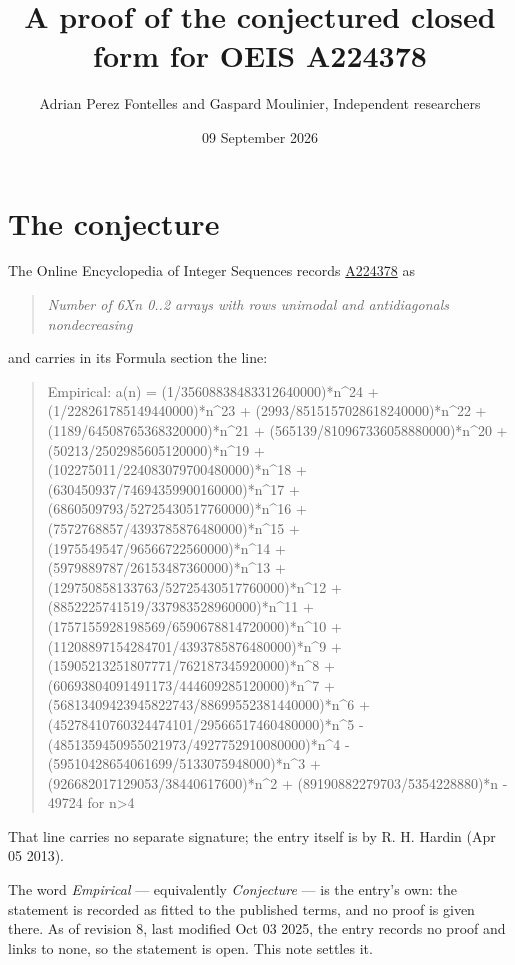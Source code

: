 \documentclass[11pt]{article}
\title{A proof of the conjectured closed form for OEIS A224378}
\author{Adrian Perez Fontelles and Gaspard Moulinier, Independent researchers}
\date{09 September 2026}
\theoremstyle{definition}
\begin{document}
\maketitle
\section{The conjecture}

The Online Encyclopedia of Integer Sequences records \href{https://oeis.org/A224378}{A224378} as

\begin{quote}\itshape Number of 6Xn 0..2 arrays with rows unimodal and antidiagonals nondecreasing\end{quote}

and carries in its Formula section the line:

\begin{quote}\ttfamily Empirical: a(n) = (1/35608838483312640000)*n\textasciicircum{}24 + (1/228261785149440000)*n\textasciicircum{}23 + (2993/8515157028618240000)*n\textasciicircum{}22 + (1189/64508765368320000)*n\textasciicircum{}21 + (565139/810967336058880000)*n\textasciicircum{}20 + (50213/2502985605120000)*n\textasciicircum{}19 + (102275011/224083079700480000)*n\textasciicircum{}18 + (630450937/74694359900160000)*n\textasciicircum{}17 + (6860509793/52725430517760000)*n\textasciicircum{}16 + (7572768857/4393785876480000)*n\textasciicircum{}15 + (1975549547/96566722560000)*n\textasciicircum{}14 + (5979889787/26153487360000)*n\textasciicircum{}13 + (129750858133763/52725430517760000)*n\textasciicircum{}12 + (8852225741519/337983528960000)*n\textasciicircum{}11 + (1757155928198569/6590678814720000)*n\textasciicircum{}10 + (11208897154284701/4393785876480000)*n\textasciicircum{}9 + (15905213251807771/762187345920000)*n\textasciicircum{}8 + (60693804091491173/444609285120000)*n\textasciicircum{}7 + (56813409423945822743/88699552381440000)*n\textasciicircum{}6 + (45278410760324474101/29566517460480000)*n\textasciicircum{}5 - (4851359450955021973/4927752910080000)*n\textasciicircum{}4 - (59510428654061699/5133075948000)*n\textasciicircum{}3 + (926682017129053/38440617600)*n\textasciicircum{}2 + (89190882279703/5354228880)*n - 49724 for n>4\end{quote}

That line carries no separate signature; the entry itself is by R. H. Hardin (Apr 05 2013).

The word {\itshape Empirical} --- equivalently {\itshape Conjecture} --- is the entry's own: the statement is recorded as fitted to the published terms, and no proof is given there. As of revision 8, last modified Oct 03 2025, the entry records no proof and links to none, so the statement is open. This note settles it.
\end{document}
